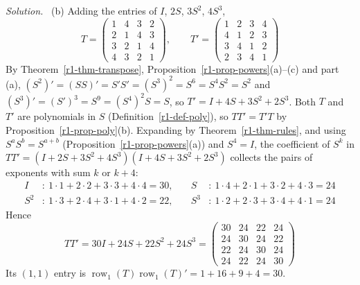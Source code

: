 \documentclass[12pt]{article}
\DeclareMathOperator{\row}{row}
\theoremstyle{definition}
\newenvironment{solution}{\par\noindent\textit{Solution.}\ }{\par\smallskip}
\begin{document}
\begin{solution}
(b) Adding the entries of \(I\), \(2S\), \(3S^2\), \(4S^3\),
\[
T=\begin{pmatrix}1&4&3&2\\2&1&4&3\\3&2&1&4\\4&3&2&1\end{pmatrix},\qquad
T'=\begin{pmatrix}1&2&3&4\\4&1&2&3\\3&4&1&2\\2&3&4&1\end{pmatrix}
\]
By Theorem~\ref{r1-thm-transpose}, Proposition~\ref{r1-prop-powers}(a)--(c) and part (a),
\((S^2)'=(SS)'=S'S'=(S^3)^2=S^6=S^4S^2=S^2\) and \((S^3)'=(S')^3=S^9=(S^4)^2S=S\), so \(T'=I+4S+3S^2+2S^3\).
Both \(T\) and \(T'\) are polynomials in \(S\) (Definition~\ref{r1-def-poly}), so \(TT'=T'T\) by
Proposition~\ref{r1-prop-poly}(b). Expanding by Theorem~\ref{r1-thm-rules}, and using \(S^aS^b=S^{a+b}\)
(Proposition~\ref{r1-prop-powers}(a)) and \(S^4=I\), the coefficient of \(S^k\) in
\(TT'=(I+2S+3S^2+4S^3)(I+4S+3S^2+2S^3)\) collects the pairs of exponents with sum \(k\) or
\(k+4\):
\[
\begin{aligned}
I&:\ 1\cdot1+2\cdot2+3\cdot3+4\cdot4=30, &\quad S&:\ 1\cdot4+2\cdot1+3\cdot2+4\cdot3=24\\
S^2&:\ 1\cdot3+2\cdot4+3\cdot1+4\cdot2=22, &\quad S^3&:\ 1\cdot2+2\cdot3+3\cdot4+4\cdot1=24
\end{aligned}
\]
Hence
\[
TT'=30I+24S+22S^2+24S^3=\begin{pmatrix}30&24&22&24\\24&30&24&22\\22&24&30&24\\24&22&24&30\end{pmatrix}
\]
Its \((1,1)\) entry is \(\row_1(T)\row_1(T)'=1+16+9+4=30\).
\end{solution}
\end{document}
